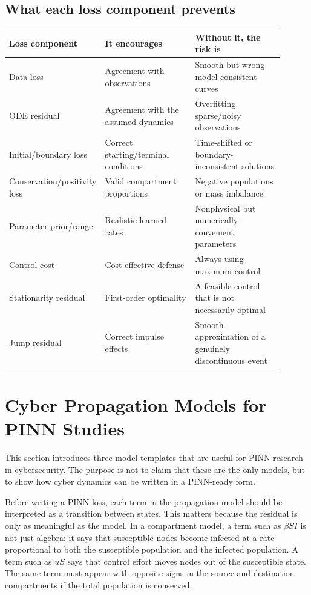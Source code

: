 \documentclass[11pt,a4paper]{article}
\begin{document}
\subsection{What each loss component prevents}
\begin{longtable}{p{0.22\linewidth}p{0.34\linewidth}p{0.34\linewidth}}
\toprule
Loss component & It encourages & Without it, the risk is \\
\midrule
Data loss & Agreement with observations & Smooth but wrong model-consistent curves \\
ODE residual & Agreement with the assumed dynamics & Overfitting sparse/noisy observations \\
Initial/boundary loss & Correct starting/terminal conditions & Time-shifted or boundary-inconsistent solutions \\
Conservation/positivity loss & Valid compartment proportions & Negative populations or mass imbalance \\
Parameter prior/range & Realistic learned rates & Nonphysical but numerically convenient parameters \\
Control cost & Cost-effective defense & Always using maximum control \\
Stationarity residual & First-order optimality & A feasible control that is not necessarily optimal \\
Jump residual & Correct impulse effects & Smooth approximation of a genuinely discontinuous event \\
\bottomrule
\end{longtable}

\section{Cyber Propagation Models for PINN Studies}

This section introduces three model templates that are useful for PINN research in cybersecurity. The purpose is not to claim that these are the only models, but to show how cyber dynamics can be written in a PINN-ready form.

Before writing a PINN loss, each term in the propagation model should be interpreted as a transition between states. This matters because the residual is only as meaningful as the model. In a compartment model, a term such as $\beta S I$ is not just algebra: it says that susceptible nodes become infected at a rate proportional to both the susceptible population and the infected population. A term such as $uS$ says that control effort moves nodes out of the susceptible state. The same term must appear with opposite signs in the source and destination compartments if the total population is conserved.
\end{document}

